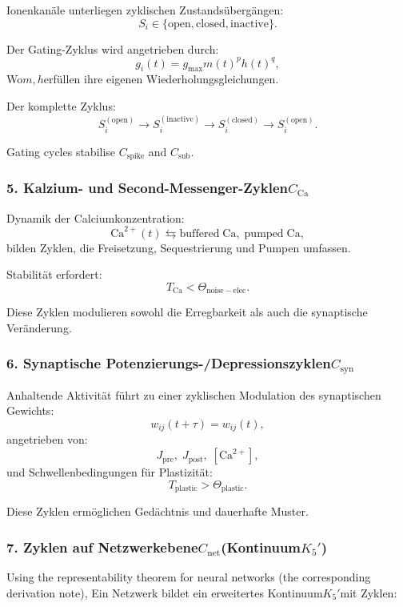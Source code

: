 Ionenkanäle unterliegen zyklischen Zustandsübergängen:
\[
  S_i \in \{\mathrm{open}, \mathrm{closed}, \mathrm{inactive}\}.
\]

Der Gating-Zyklus wird angetrieben durch:
\[
  g_i(t) = g_{\mathrm{max}} m(t)^p h(t)^q,
\]
Wo$m,h$erfüllen ihre eigenen Wiederholungsgleichungen.

Der komplette Zyklus:
\[
  S_i^{(\mathrm{open})}
  \to 
  S_i^{(\mathrm{inactive})}
  \to
  S_i^{(\mathrm{closed})}
  \to
  S_i^{(\mathrm{open})}.
\]

Gating cycles stabilise $C_{\mathrm{spike}}$ and $C_{\mathrm{sub}}$.

\subsubsection{5. Kalzium- und Second-Messenger-Zyklen$C_{\mathrm{Ca}}$}

Dynamik der Calciumkonzentration:
\[
  \mathrm{Ca}^{2+}(t)
  \leftrightarrows
  \mathrm{buffered\; Ca},\;
  \mathrm{pumped\; Ca},
\]
bilden Zyklen, die Freisetzung, Sequestrierung und Pumpen umfassen.

Stabilität erfordert:
\[
  T_{\mathrm{Ca}} < \Theta_{\mathrm{noise-elec}}.
\]

Diese Zyklen modulieren sowohl die Erregbarkeit als auch die synaptische Veränderung.

\subsubsection{6. Synaptische Potenzierungs-/Depressionszyklen$C_{\mathrm{syn}}$}

Anhaltende Aktivität führt zu einer zyklischen Modulation des synaptischen Gewichts:
\[
  w_{ij}(t+\tau) = w_{ij}(t),
\]
angetrieben von:
\[
  J_{\mathrm{pre}},\; J_{\mathrm{post}},\; [\mathrm{Ca}^{2+}],
\]
und Schwellenbedingungen für Plastizität:
\[
  T_{\mathrm{plastic}} > \Theta_{\mathrm{plastic}}.
\]

Diese Zyklen ermöglichen Gedächtnis und dauerhafte Muster.

\subsubsection{7. Zyklen auf Netzwerkebene$C_{\mathrm{net}}$(Kontinuum$K_5'$)}

Using the representability theorem for neural networks (the corresponding derivation note),
Ein Netzwerk bildet ein erweitertes Kontinuum$K_5'$mit Zyklen:

